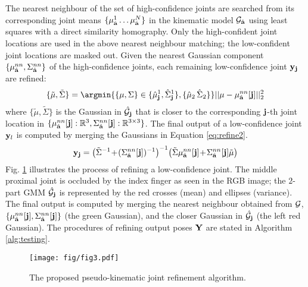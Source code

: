 The nearest neighbour of the set of high-confidence joints are searched from its corresponding joint means $\{\mu_{\hat{\mathbf{a}}}^{1}\dots\mu_{\hat{\mathbf{a}}}^{N}\}$ in the kinematic model $\mathcal{G}_{\hat{\mathbf{a}}}$ using least squares with a direct similarity homography. Only the high-confident joint locations are used in the above nearest neighbour matching; the low-confident joint locations are masked out. 
Given the nearest Gaussian component $\{\mu_{\hat{\mathbf{a}}}^{nn}, \Sigma_{\hat{\mathbf{a}}}^{nn}\}$ of the high-confidence joints, each remaining low-confidence joint $\mathbf{y}_{\mathbf{j}}$ are refined: 
\begin{equation}
		\{\tilde{\mu}, \tilde{\Sigma}\} 
		= \argmin{\{\mu, \Sigma\} \in \{\hat{\mu}_{\joint}^{1}, \hat{\Sigma}_{\joint}^{1}\},  \{\hat{\mu}_{2}\, \hat{\Sigma}_{2}\}}  
		||\mu - \mu_{\testviewlabel}^{nn}[\joint]||^2_2
		\label{eq:refine1}
\end{equation}
where $\{\tilde{\mu}, \tilde{\Sigma}\}$ is the Gaussian in $\hat{\mathcal{G}}_{\mathbf{j}}$ that is closer to the corresponding $\mathbf{j}$-th joint location in $\{\mu_{\hat{\mathbf{a}}}^{nn}[\mathbf{j}]:\mathbb{R}^{3}, \Sigma_{\hat{\mathbf{a}}}^{nn}[\mathbf{j}]:\mathbb{R}^{3\times3}\}$. The final output of a low-confidence joint $\mathbf{y}_{l}$ is computed by merging the Gaussians in Equation \ref{eq:refine2}. 
\begin{equation}
	\mathbf{y}_{\mathbf{j}} =
	\left(\tilde{\Sigma}^{-1}\!+\!(\Sigma_{\hat{\mathbf{a}}}^{nn}[\mathbf{j}])^{-1}\right)^{-1}\! \left( \tilde{\Sigma} \mu_{\hat{\mathbf{a}}}^{nn}[\mathbf{j}]\!+\!\Sigma_{\hat{\mathbf{a}}}^{nn}[\mathbf{j}]\tilde{\mu}\right) 
	\label{eq:refine2}
\end{equation}
Fig. \ref{fig:refine} illustrates the process of refining a low-confidence joint. The middle
proximal joint is occluded by the index finger as seen in the RGB image; the $2$-part GMM $\hat{\mathcal{G}}_{\mathbf{j}}$ is represented by the red crosses (mean) and ellipses (variance). The final output is computed by merging the nearest neighbour obtained from $\mathcal{G}$, \ie $\{\mu_{\hat{\mathbf{a}}}^{nn}[\mathbf{j}], \Sigma_{\hat{\mathbf{a}}}^{nn}[\mathbf{j}]\}$ (the green Gaussian), and the closer Gaussian in $\hat{\mathcal{G}}_{\mathbf{j}}$ (the left red Gaussian).  
The procedures of refining output poses $\mathbf{Y}$ are stated in Algorithm \ref{alg:testing}.  

\begin{figure}[ht]
	\centering
	\texttt{[image: fig/fig3.pdf]}
	\caption{The proposed pseudo-kinematic joint refinement algorithm.}
	\label{fig:refine}
\end{figure}

